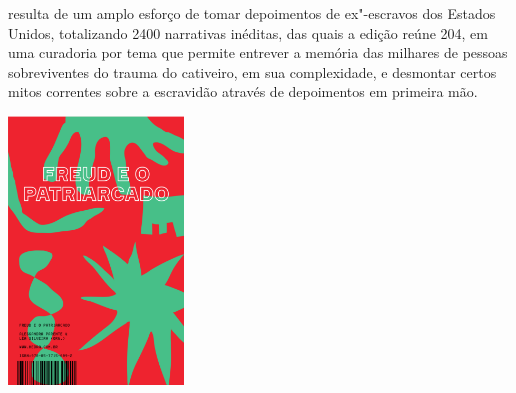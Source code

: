 \hspace*{-7cm}\hrulefill\hspace*{-7cm}

\medskip

 resulta de um amplo esforço de tomar depoimentos de ex"-escravos dos Estados Unidos, totalizando 2400 narrativas inéditas, das quais a edição reúne 204, em uma curadoria por tema que permite entrever a memória das milhares de pessoas sobreviventes do trauma do cativeiro, em sua complexidade, e desmontar certos mitos correntes sobre a escravidão através de depoimentos em primeira mão.


\vfill

\hspace*{-.4cm}\begin{minipage}[c]{1\linewidth}
\small{
{}}
\end{minipage}

\pagebreak

\hspace{.5cm}

\begin{center}
\hspace*{-.5cm}\includegraphics[width=46.5mm]{./imgs/freud.png}
\end{center}


